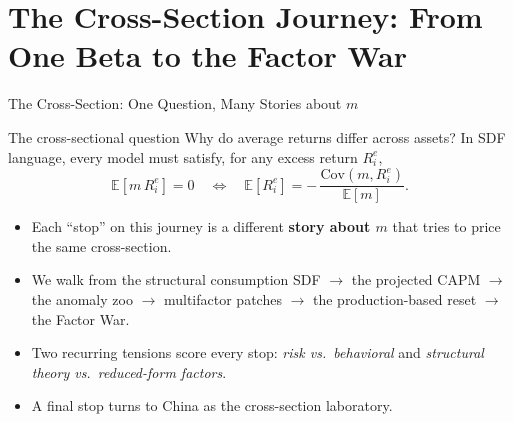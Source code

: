 \documentclass{beamer}
\newcommand{\E}{\mathbb{E}}
\newcommand{\Var}{\mathrm{Var}}
\newcommand{\Cov}{\mathrm{Cov}}
\begin{document}

\section{The Cross-Section Journey: From One Beta to the Factor War}

\begin{frame}{The Cross-Section: One Question, Many Stories about $m$}
\begin{block}{The cross-sectional question}
Why do \alert{average returns differ across assets}? In SDF language, every model must satisfy, for any excess return $R^e_i$,
\[
\E[m\,R^e_i]=0 \quad\Longleftrightarrow\quad \E[R^e_i] = -\,\frac{\Cov(m,R^e_i)}{\E[m]}.
\]
\end{block}
\begin{itemize}
  \item Each ``stop'' on this journey is a different \textbf{story about $m$} that tries to price the same cross-section.
  \item We walk from the \alert{structural} consumption SDF $\to$ the projected CAPM $\to$ the anomaly zoo $\to$ multifactor patches $\to$ the production-based reset $\to$ the \alert{Factor War}.
  \item Two recurring tensions score every stop: \textit{risk vs.\ behavioral} and \textit{structural theory vs.\ reduced-form factors}.
  \item A final stop turns to \alert{China} as the cross-section laboratory.
\end{itemize}
\end{frame}
\end{document}
